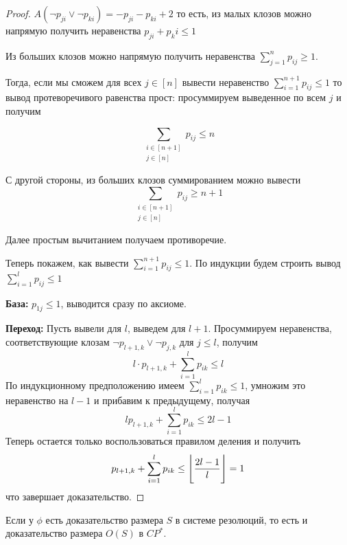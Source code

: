 \begin{proof}

$A(\lnot p_{ji} \lor \lnot p_{ki}) = -p_{ji} - p_{ki} + 2$
то есть, из малых клозов можно напрямую получить неравенства $p_{ji} + p_ki \le 1$

Из больших клозов можно напрямую получить неравенства $\sum\limits_{j=1}^n p_{ij} \ge 1$.

Тогда, если мы сможем для всех $j \in [n]$ вывести неравенство 
$\sum\limits_{i=1}^{n+1} p_{ij} \le 1$ то вывод протеворечивого равенства прост:
просуммируем выведенное по всем $j$ и получим

$$\sum\limits_{\substack{i\in[n+1] \\ j \in [n]}} p_{ij} \le n$$

С другой стороны, из больших клозов суммированием можно вывести
$$\sum\limits_{\substack{i\in[n+1] \\ j \in [n]}} p_{ij} \ge n+1$$


Далее простым вычитанием получаем противоречие.

Теперь покажем, как вывести $\sum\limits_{i=1}^{n+1} p_{ij} \le 1$. 
По индукции будем строить вывод $\sum\limits_{i=1}^{l} p_{ij} \le 1$

{\bfseries База:} $p_{1j} \le 1$, выводится сразу по аксиоме.

{\bfseries Переход:} Пусть вывели для $l$, выведем для $l+1$. Просуммируем
неравенства, соответствующие клозам $\lnot p_{l+1, k} \lor \lnot p_{j, k}$ 
для $j \le l$, получим $$l \cdot p_{l+1,k} + \sum\limits_{i=1}^l p_{ik} \le l$$
По индукционному предположению имеем $\sum\limits_{i=1}^l p_{ik} \le 1$, умножим
это неравенство на $l-1$ и прибавим к предыдущему, получая
  $$l p_{l+1, k} + \sum\limits_{i=1}^l p_{ik} \le 2l - 1$$
Теперь остается только воспользоваться правилом деления и получить
$$p_{l+1,k} + \sum\limits_{i=1}^l p_{ik} \le \Bigg\lfloor {2l - 1 \over l} \Bigg\rfloor = 1$$
что завершает доказательство.
\end{proof}

\begin{theorem}
Если у $\phi$ есть доказательство размера $S$ в системе резолюций, то
есть и доказательство размера $O(S)$ в $CP^*$.

\end{theorem}

